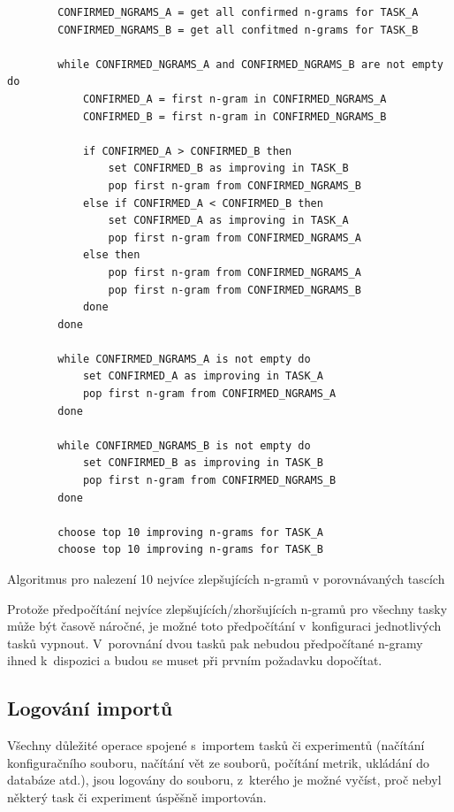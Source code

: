 \begin{algorithm}
	\begin{verbatim}
		CONFIRMED_NGRAMS_A = get all confirmed n-grams for TASK_A
		CONFIRMED_NGRAMS_B = get all confitmed n-grams for TASK_B

		while CONFIRMED_NGRAMS_A and CONFIRMED_NGRAMS_B are not empty do
		    CONFIRMED_A = first n-gram in CONFIRMED_NGRAMS_A
		    CONFIRMED_B = first n-gram in CONFIRMED_NGRAMS_B

		    if CONFIRMED_A > CONFIRMED_B then
		        set CONFIRMED_B as improving in TASK_B
		        pop first n-gram from CONFIRMED_NGRAMS_B
		    else if CONFIRMED_A < CONFIRMED_B then
		        set CONFIRMED_A as improving in TASK_A
		        pop first n-gram from CONFIRMED_NGRAMS_A
		    else then
		        pop first n-gram from CONFIRMED_NGRAMS_A
		        pop first n-gram from CONFIRMED_NGRAMS_B
		    done
		done

		while CONFIRMED_NGRAMS_A is not empty do
		    set CONFIRMED_A as improving in TASK_A
		    pop first n-gram from CONFIRMED_NGRAMS_A
		done

		while CONFIRMED_NGRAMS_B is not empty do
		    set CONFIRMED_B as improving in TASK_B
		    pop first n-gram from CONFIRMED_NGRAMS_B
		done

		choose top 10 improving n-grams for TASK_A
		choose top 10 improving n-grams for TASK_B
	\end{verbatim}

	\caption{Algoritmus pro nalezení 10 nejvíce zlepšujících \mbox{n-gramů} v porovnávaných tascích}
	\label{alg:improving}
\end{algorithm}



Protože předpočítání nejvíce zlepšujících/zhoršujících \mbox{n-gramů} pro všechny tasky může být časově náročné,
  je možné toto předpočítání v~konfiguraci jednotlivých tasků vypnout.
V~porovnání dvou tasků pak nebudou předpočítané \mbox{n-gramy} ihned k~dispozici
  a budou se muset při prvním požadavku dopočítat. 

\subsection{Logování importů}
Všechny důležité operace spojené s~importem tasků či experimentů
  (načítání konfiguračního souboru, načítání vět ze souborů,
  počítání metrik, ukládání do databáze atd.), 
  jsou logovány do souboru,
  z~kterého je možné vyčíst,
  proč nebyl některý task či experiment úspěšně importován. 


